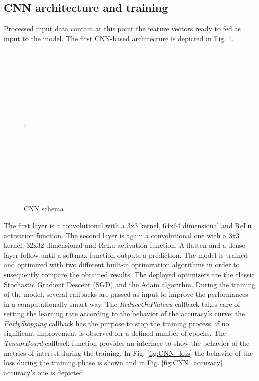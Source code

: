 \subsection*{\textbf {CNN architecture and training}}Processed input data contain at this point the feature vectors ready to fed as input to the model. The first CNN-based architecture is depicted in Fig. \ref{fig:CNN_schema}. 
\begin{figure}[h]
			\centering
	    	\includegraphics[width=5, height=8cm, width=0.25\textwidth]{CNN_schema}
	    	\caption{CNN schema}
	    	\label{fig:CNN_schema}
\end{figure} 
\noindent The first layer is a convolutional with a 3x3 kernel, 64x64 dimensional and ReLu activation function. The second layer is again a convolutional one with a 3x3 kernel, 32x32 dimensional and ReLu activation function. A flatten and a dense layer follow until a softmax function outputs a prediction. The model is trained and optimized with two different built-in optimization algorithms in order to susequently compare the obtained results. The deployed optimizers are the classic Stochastic Gradient Descent (SGD) and the Adam algorithm. During the training of the model, several callbacks are passed as input to improve the performances in a computationally smart way. The {\it{ReduceOnPlateau}} callback takes care of setting the learning rate according to the behavior of the accuracy's curve; the {\it{EarlyStopping}} callback has the purpose to stop the training process, if no significant improvement is observed for a defined number of epochs. The {\it{TensorBoard}} callback function provides an interface to show the behavior of the metrics of interest during the training. In Fig. \ref{fig:CNN_loss} the behavior of the loss during the training phase is shown and in Fig.  \ref{fig:CNN_accuracy} accuracy's one is depicted.

